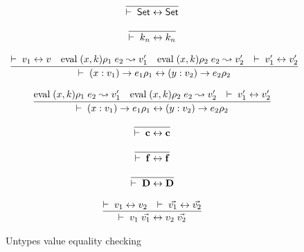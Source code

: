 \begin{figure}[p]
\caption{Untypes value equality checking}

\[\begin{array}{c}
	  \infer{\EqVal{\Set}{\Set}}
          {}
\end{array}\]

\[\begin{array}{c}
	  \infer{\EqVal{k_n}{k_n}}
          {}
\end{array}\]

\[\begin{array}{c}
	  \infer{\EqVal{\EPi{x}{v_1}{e_1}{\rho_1}}{\EPi{y}{v_2}{e_2}{\rho_2}}}
          {   \EqVal{v_1}{v} 
& \Eval{(x,k)\rho_1}{e_2}{v'_1}
& \Eval{(x,k)\rho_2}{e_2}{v'_2}
& \EqVal{v'_1}{v'_2}}
\end{array}\]

\[\begin{array}{c}
	  \infer{\EqVal{\EPi{x}{v_1}{e_1}{\rho_1}}{\EPi{y}{v_2}{e_2}{\rho_2}}}
          {
\Eval{(x,k)\rho_1}{e_2}{v'_1}
& \Eval{(x,k)\rho_2}{e_2}{v'_2}
& \EqVal{v'_1}{v'_2}}
\end{array}\]

\[\begin{array}{c}
	  \infer{\EqVal{\cc}{\cc}}
          {}
\end{array}\]

\[\begin{array}{c}
	  \infer{\EqVal{\ff}{\ff}}
          {}
\end{array}\]

\[\begin{array}{c}
	  \infer{\EqVal{\DD}{\DD}}
          {}
\end{array}\]


\[\begin{array}{c}
	  \infer{\EqVal{v_1 \; \vec{v_1}}{v_2 \; \vec{v_2}}}
          {\EqVal{v_1}{v_2} & \EqVal{\vec{v_1}}{\vec{v_2}}}
\end{array}\]


\end{figure}

